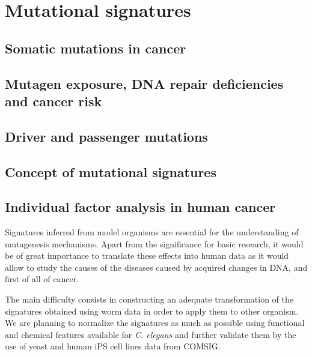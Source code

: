 

\pagestyle{empty}


\section{Mutational signatures}


\subsection{Somatic mutations in cancer}

\subsection*{Mutagen exposure, DNA repair deficiencies and cancer risk}

\subsection*{Driver and passenger mutations}





\subsection{Concept of mutational signatures}

\subsection*{Individual factor analysis in human cancer }

Signatures inferred from model organisms are essential for the understanding of mutagenesis mechanisms. 
Apart from the significance for basic research, it would be of great importance to  translate these 
effects into human data as it would allow to study the causes of the diseases caused by acquired 
changes in DNA, and first of all of cancer.

The main difficulty consists in constructing an adequate transformation of the signatures 
obtained using worm data in order to apply them to other organism. We are planning to 
normalize the signatures as much as possible using functional and chemical features 
available for \textit{C. elegans} and further validate them by the use of yeast and 
human iPS cell lines data from COMSIG.


